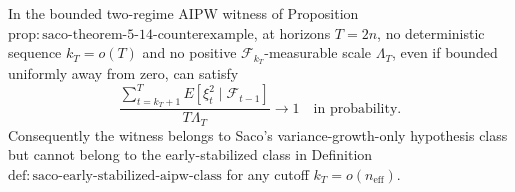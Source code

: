 In the bounded two-regime AIPW witness of Proposition~\(\mathrm{prop:saco\text{-}theorem\text{-}5\text{-}14\text{-}counterexample}\), at horizons \(T=2n\), no deterministic sequence \(k_T=o(T)\) and no positive \(\mathcal F_{k_T}\)-measurable scale \(\Lambda_T\), even if bounded uniformly away from zero, can satisfy
\[
\frac{\sum_{t=k_T+1}^{T}E[\xi_t^2\mid\mathcal F_{t-1}]}{T\Lambda_T}\longrightarrow1
\quad\text{in probability}.
\]
Consequently the witness belongs to Saco's variance-growth-only hypothesis class but cannot belong to the early-stabilized class in Definition~\(\mathrm{def:saco\text{-}early\text{-}stabilized\text{-}aipw\text{-}class}\) for any cutoff \(k_T=o(n_{\mathrm{eff}})\).